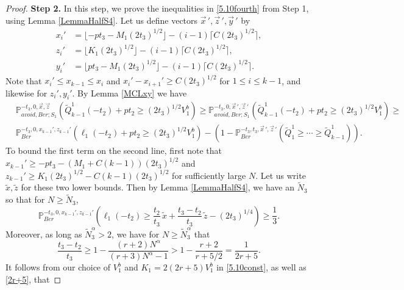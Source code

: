 \begin{proof}
	\noindent\textbf{Step 2.} In this step, we prove the inequalities in \eqref{5.10fourth} from Step 1, using Lemma \ref{LemmaHalfS4}. Let us define vectors $\vec{x}\,', \vec{z}\,', \vec{y}\,'$ by
	\begin{align*}
	x_i' &= \lfloor -pt_3 - M_1(2t_3)^{1/2}\rfloor - (i-1)\lceil C(2t_3)^{1/2}\rceil,\\
	z_i' &= \lfloor K_1(2t_3)^{1/2}\rfloor - (i-1)\lceil C(2t_3)^{1/2}\rceil,\\
	y_i' &= \lfloor pt_3 - M_1(2t_3)^{1/2}\rfloor - (i-1)\lceil C(2t_3)^{1/2}\rceil.
	\end{align*}
	Note that $x_i' \leq x_{k-1} \leq x_i$ and $x_i' - x_{i+1}' \geq C(2t_3)^{1/2}$ for $1\leq i\leq k - 1$, and likewise for $z_i',y_i'$. By Lemma \ref{MCLxy} we have
	\begin{equation}\label{5.10separate}
	\begin{split}
	&\mathbb{P}^{-t_3,0,\vec{x},\vec{z}}_{avoid,Ber;S_1}\left(\tilde{Q}^1_{k-1}(-t_2) + pt_2 \geq (2t_3)^{1/2}V_1^b\right) \geq \mathbb{P}^{-t_3,0,\vec{x}\,',\vec{z}\,'}_{avoid,Ber;S_1}\left(\tilde{Q}^1_{k-1}(-t_2) + pt_2 \geq (2t_3)^{1/2}V_1^b\right) \geq \\ 
	& \mathbb{P}^{-t_3,0,x_{k-1}',z_{k-1}'}_{Ber}\left(\ell_1(-t_2) + pt_2 \geq (2t_3)^{1/2}V_1^b\right) - \left( 1 - \mathbb{P}^{-t_3,t_3,\vec{x}\,',\vec{z}\,'}_{Ber}\left(\tilde{Q}^1_1 \geq \cdots \geq \tilde{Q}_{k-1}^1\right)\right).
	\end{split}
	\end{equation} 
	To bound the first term on the second line, first note that $x_{k-1}' \geq -pt_3 - (M_1+C(k-1))(2t_3)^{1/2}$ and $z_{k-1}' \geq K_1(2t_3)^{1/2} - C(k-1)(2t_3)^{1/2}$ for sufficiently large $N$. Let us write $\tilde{x},\tilde{z}$ for these two lower bounds. Then by Lemma \ref{LemmaHalfS4}, we have an $\tilde{N}_3$ so that for $N\geq\tilde{N}_3$,
	\begin{equation}\label{5.10third1}
	\mathbb{P}^{-t_3,0,x_{k-1}',z_{k-1}'}_{Ber}\left(\ell_1(-t_2) \geq \frac{t_2}{t_3}\,\tilde{x} + \frac{t_3-t_2}{t_3}\,\tilde{z} - (2t_3)^{1/4}\right) \geq \frac{1}{3}.
	\end{equation}  
	Moreover, as long as $\tilde{N}_3^\alpha > 2$, we have for $N\geq\tilde{N}_3^\alpha$ that
	\begin{equation}\label{2r+5}
	\frac{t_3-t_2}{t_3} \geq 1 - \frac{(r+2)N^\alpha}{(r+3)N^\alpha - 1} > 1-\frac{r+2}{r+5/2} = \frac{1}{2r+5}.
	\end{equation}
	It follows from our choice of $V_1^b$ and $K_1 = 2(2r+5)V_1^b$ in \eqref{5.10const}, as well as \eqref{2r+5}, that 

\end{proof}
